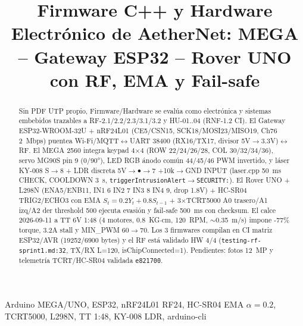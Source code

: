 \documentclass[conference]{IEEEtran}
\begin{document}
\title{Firmware C++ y Hardware Electrónico de AetherNet: MEGA -- Gateway ESP32 -- Rover UNO con RF, EMA y Fail-safe}
\author{
\and
{}
}
\maketitle

\begin{abstract}
Sin PDF UTP propio, Firmware/Hardware se evalúa como electrónica y sistemas embebidos trazables a RF-2.1/2.2/2.3/3.1/3.2 y HU-01..04 (RNF-1.2 CI). El Gateway ESP32-WROOM-32U + nRF24L01 (CE5/CSN15, SCK18/MOSI23/MISO19, Ch76 2~Mbps) puentea Wi-Fi/MQTT$\leftrightarrow$UART 38400 (RX16/TX17, divisor 5V$\rightarrow$3.3V)$\leftrightarrow$RF. El MEGA 2560 integra keypad 4$\times$4 (ROW 22/24/26/28, COL 30/32/34/36), servo MG90S pin 9 (0/90°), LED RGB ánodo común 44/45/46 PWM invertido, y láser KY-008 S$\rightarrow$8 + LDR discreta 5V$\rightarrow\bullet\rightarrow$7 +10k$\rightarrow$GND INPUT (laser.cpp 50~ms CHECK, COOLDOWN 3~s, \texttt{triggerIntrusionAlert}$\rightarrow$\texttt{SECURITY:}). El Rover UNO + L298N (ENA5/ENB11, IN1 6 IN2 7 IN3 8 IN4 9, drop 1.8V) + HC-SR04 TRIG2/ECHO3 con EMA $S_t=0.2Y_t+0.8S_{t-1}$ + 3$\times$TCRT5000 A0 trasero/A1 izq/A2 der threshold 500 ejecuta evasión y fail-safe 500~ms con checksum. El calce 2026-09-11 a TT 6V 1:48 (4 motores, 0.8~KG$\cdot$cm, 120~RPM, $\sim$0.35~m/s) impone -77\% torque, 3.2A stall y MIN\_PWM 60$\rightarrow$70. Los 3 firmwares compilan en CI matriz ESP32/AVR (19252/6900 bytes) y el RF está validado HW 4/4 (\texttt{testing-rf-sprint1.md:32}, TX/RX L=120, isChipConnected=1). Pendientes: fotos 12~MP y telemetría TCRT/HC-SR04 validada \texttt{e821700}.
\end{abstract}
\begin{IEEEkeywords}
Arduino MEGA/UNO, ESP32, nRF24L01 RF24, HC-SR04 EMA $\alpha=0.2$, TCRT5000, L298N, TT 1:48, KY-008 LDR, arduino-cli
\end{IEEEkeywords}
\end{document}
